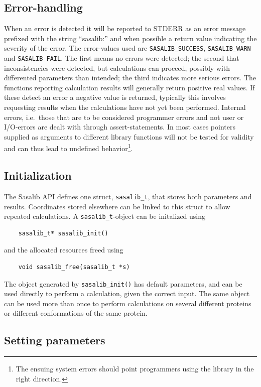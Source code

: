 \documentclass[a4paper,11pt]{article}
\begin{document}
\subsection{Error-handling}

When an error is detected it will be reported to STDERR as an error
message prefixed with the string ``sasalib:'' and when possible a
return value indicating the severity of the error. The error-values
used are \verb|SASALIB_SUCCESS|, \verb|SASALIB_WARN| and
\verb|SASALIB_FAIL|. The first means no errors were detected; the
second that inconsistencies were detected, but calculations can
proceed, possibly with differented parameters than intended; the third
indicates more serious errors. The functions reporting calculation
results will generally return positive real values. If these detect an
error a negative value is returned, typically this involves requesting
results when the calculations have not yet been performed.  Internal
errors, i.e.\ those that are to be considered programmer errors and
not user or I/O-errors are dealt with through assert-statements. In
most cases pointers supplied as arguments to different library
functions will not be tested for validity and can thus lead to
undefined behavior\footnote{The ensuing system errors should point
  programmers using the library in the right direction.}.

\subsection{Initialization}

The Sasalib API defines one struct, \verb|sasalib_t|, that stores both
parameters and results. Coordinates stored elsewhere can be linked to
this struct to allow repeated calculations. A \verb|sasalib_t|-object
can be initalized using
\begin{verbatim}
    sasalib_t* sasalib_init()
\end{verbatim}
and the allocated resources freed using
\begin{verbatim}
    void sasalib_free(sasalib_t *s)
\end{verbatim}
The object generated by \verb|sasalib_init()| has default parameters,
and can be used directly to perform a calculation, given the correct
input. The same object can be used more than once to perform
calculations on several different proteins or different conformations
of the same protein.

\subsection{Setting parameters}
\end{document}
